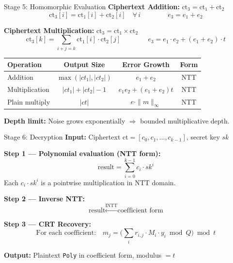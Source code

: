 \documentclass[aspectratio=169, 11pt]{beamer}
\begin{document}
\begin{frame}{Stage 5: Homomorphic Evaluation}
\textbf{Ciphertext Addition:} $\text{ct}_3 = \text{ct}_1 + \text{ct}_2$
\[
    \text{ct}_3[i] = \text{ct}_1[i] + \text{ct}_2[i] \quad \forall\, i
    \qquad\qquad
    e_3 = e_1 + e_2
\]

\vspace{0.3em}
\textbf{Ciphertext Multiplication:} $\text{ct}_3 = \text{ct}_1 \times \text{ct}_2$
\[
    \text{ct}_3[k] = \sum_{i+j=k} \text{ct}_1[i] \cdot \text{ct}_2[j]
    \qquad\qquad
    e_3 = e_1 \cdot e_2 + (e_1 + e_2)\cdot t
\]

\vspace{0.3em}
\begin{center}
\begin{tabular}{lccc}
\toprule
\textbf{Operation} & \textbf{Output Size} & \textbf{Error Growth} & \textbf{Form} \\
\midrule
Addition & $\max(|ct_1|, |ct_2|)$ & $e_1 + e_2$ & NTT \\
Multiplication & $|ct_1| + |ct_2| - 1$ & $e_1 e_2 + (e_1+e_2)t$ & NTT \\
Plain multiply & $|ct|$ & $e \cdot \|m\|_\infty$ & NTT \\
\bottomrule
\end{tabular}
\end{center}

\vspace{0.3em}
\textbf{Depth limit:} Noise grows exponentially $\Rightarrow$ bounded multiplicative depth.
\end{frame}

\begin{frame}{Stage 6: Decryption}
\textbf{Input:} Ciphertext $\text{ct} = [c_0, c_1, \ldots, c_{k-1}]$, secret key $sk$

\vspace{0.5em}
\textbf{Step 1 --- Polynomial evaluation (NTT form):}
\[
    \text{result} = \sum_{i=0}^{k-1} c_i \cdot sk^{i}
\]
Each $c_i \cdot sk^i$ is a pointwise multiplication in NTT domain.

\vspace{0.3em}
\textbf{Step 2 --- Inverse NTT:}
\[
    \text{result} \xleftarrow{\text{INTT}} \text{coefficient form}
\]

\textbf{Step 3 --- CRT Recovery:}
\[
    \text{For each coefficient:} \quad
    m_j = \biggl(\sum_{i} r_{i,j} \cdot M_i \cdot y_i \bmod Q\biggr) \bmod t
\]

\vspace{0.3em}
\textbf{Output:} Plaintext \texttt{Poly} in coefficient form, modulus $= t$
\end{frame}
\end{document}

